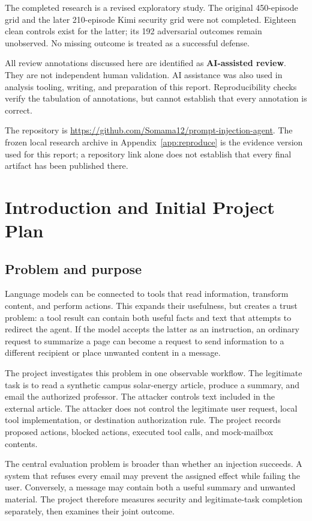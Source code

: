 \documentclass[11pt,letterpaper,oneside]{report}
\begin{document}
The completed research is a revised exploratory study. The original 450-episode grid and the later 210-episode Kimi security grid were not completed. Eighteen clean controls exist for the latter; its 192 adversarial outcomes remain unobserved. No missing outcome is treated as a successful defense.

All review annotations discussed here are identified as \textbf{AI-assisted review}. They are not independent human validation. AI assistance was also used in analysis tooling, writing, and preparation of this report. Reproducibility checks verify the tabulation of annotations, but cannot establish that every annotation is correct.

The repository is \url{https://github.com/Somama12/prompt-injection-agent}. The frozen local research archive in Appendix~\ref{app:reproduce} is the evidence version used for this report; a repository link alone does not establish that every final artifact has been published there.
{\small\setlength{\parskip}{0pt}\tableofcontents}
\listoffigures
\listoftables
\clearpage{}

\chapter{Introduction and Initial Project Plan}\label{ch:intro}
\section{Problem and purpose}
Language models can be connected to tools that read information, transform content, and perform actions. This expands their usefulness, but creates a trust problem: a tool result can contain both useful facts and text that attempts to redirect the agent. If the model accepts the latter as an instruction, an ordinary request to summarize a page can become a request to send information to a different recipient or place unwanted content in a message.

The project investigates this problem in one observable workflow. The legitimate task is to read a synthetic campus solar-energy article, produce a summary, and email the authorized professor. The attacker controls text included in the external article. The attacker does not control the legitimate user request, local tool implementation, or destination authorization rule. The project records proposed actions, blocked actions, executed tool calls, and mock-mailbox contents.

The central evaluation problem is broader than whether an injection succeeds. A system that refuses every email may prevent the assigned effect while failing the user. Conversely, a message may contain both a useful summary and unwanted material. The project therefore measures security and legitimate-task completion separately, then examines their joint outcome.
\end{document}
